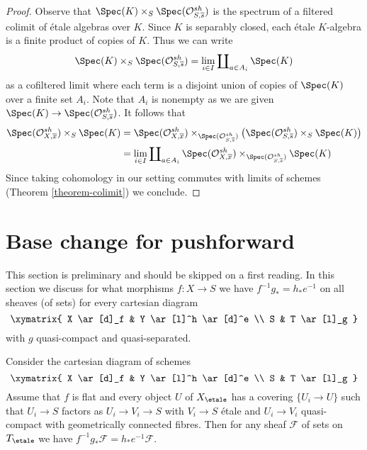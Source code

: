 \begin{proof}
Observe that $\Spec(K) \times_S \Spec(\mathcal{O}^{sh}_{S, \overline{s}})$
is the spectrum of a filtered colimit of \'etale algebras over $K$.
Since $K$ is separably closed, each \'etale $K$-algebra
is a finite product of copies of $K$. Thus we can write
$$
\Spec(K) \times_S \Spec(\mathcal{O}^{sh}_{S, \overline{s}}) =
\lim_{i \in I} \coprod\nolimits_{a \in A_i} \Spec(K)
$$
as a cofiltered limit where each term is a disjoint union
of copies of $\Spec(K)$ over a finite set $A_i$.
Note that $A_i$ is nonempty as we are given
$\Spec(K) \to \Spec(\mathcal{O}^{sh}_{S, \overline{s}})$.
It follows that
\begin{align*}
\Spec(\mathcal{O}^{sh}_{X, \overline{x}}) \times_S \Spec(K)
& =
\Spec(\mathcal{O}^{sh}_{X, \overline{x}})
\times_{\Spec(\mathcal{O}^{sh}_{S, \overline{s}})}
\left(
\Spec(\mathcal{O}^{sh}_{S, \overline{s}})
\times_S \Spec(K)\right) \\
& =
\lim_{i \in I} \coprod\nolimits_{a \in A_i}
\Spec(\mathcal{O}^{sh}_{X, \overline{x}})
\times_{\Spec(\mathcal{O}^{sh}_{S, \overline{s}})} \Spec(K)
\end{align*}
Since taking cohomology in our setting commutes with limits
of schemes (Theorem \ref{theorem-colimit}) we conclude.
\end{proof}













\section{Base change for pushforward}
\label{section-base-change-f-star}

\noindent
This section is preliminary and should be skipped on a first reading.
In this section we discuss for what morphisms $f : X \to S$ we have
$f^{-1}g_* = h_*e^{-1}$ on all sheaves (of sets) for every cartesian
diagram
$$
\xymatrix{
X \ar[d]_f & Y \ar[l]^h \ar[d]^e \\
S & T \ar[l]_g
}
$$
with $g$ quasi-compact and quasi-separated.

\begin{lemma}
\label{lemma-base-change-f-star-general}
Consider the cartesian diagram of schemes
$$
\xymatrix{
X \ar[d]_f & Y \ar[l]^h \ar[d]^e \\
S & T \ar[l]_g
}
$$
Assume that $f$ is flat and every object $U$ of $X_\etale$ has
a covering $\{U_i \to U\}$ such that $U_i \to S$
factors as $U_i \to V_i \to S$ with $V_i \to S$
\'etale and $U_i \to V_i$ quasi-compact with
geometrically connected fibres.
Then for any sheaf $\mathcal{F}$ of sets on $T_\etale$ we have
$f^{-1}g_*\mathcal{F} = h_*e^{-1}\mathcal{F}$.
\end{lemma}

